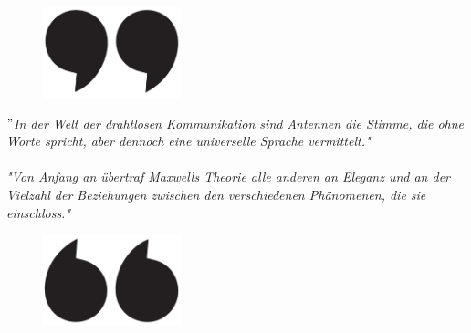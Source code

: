 \vspace*{4cm}

\begin{figure}[H]
	\includegraphics[width=4cm, left]{figures/upper-quote-marks.png}
\end{figure}

\textit{$"$In der Welt der drahtlosen Kommunikation sind Antennen die Stimme, die ohne Worte spricht, aber dennoch eine universelle Sprache vermittelt."} \\
\newline
{} \\
\vspace{2cm}
\newline
\textit{"Von Anfang an übertraf Maxwells Theorie alle anderen an Eleganz und an der Vielzahl der Beziehungen zwischen den verschiedenen Phänomenen, die sie einschloss."}\\
\newline
{}
\vspace{1cm}

\begin{figure}[H]
	\includegraphics[width=4cm, right]{figures/lower-quote-marks.png}
\end{figure}





